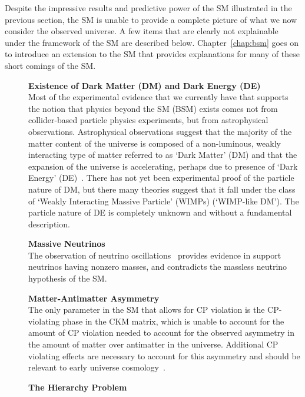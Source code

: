 Despite the impressive results and predictive power of the SM illustrated in the previous
section, the SM is unable to provide a complete picture of what we now consider the observed
universe.
A few items that are clearly not explainable under the framework of the SM are described below.
Chapter~\ref{chap:bsm} goes on to introduce an extension to the SM that provides explanations
for many of these short comings of the SM.

\begin{description}
    \item[] \textbf{Existence of Dark Matter (DM) and Dark Energy (DE)} \\
        Most of the experimental evidence that we currently have that supports the notion that
        physics beyond the SM (BSM) exists comes not from collider-based particle physics experiments,
        but from astrophysical observations.
        Astrophysical observations suggest that the majority of the matter content of the universe
        is composed of a non-luminous, weakly interacting type of matter referred to as `Dark Matter' (DM)
        and that the expansion of the universe is accelerating, perhaps due to presence of
        `Dark Energy' (DE)~\cite{Davis:2014csa,PlanckCollab}.
        There has not yet been experimental proof of the particle nature of DM, but there
        many theories suggest that it fall under the class of `Weakly Interacting Massive Particle' (WIMPs) (`WIMP-like DM').
        The particle nature of DE is completely unknown and without a fundamental description.
    \item[] \textbf{Massive Neutrinos} \\ The observation of neutrino oscillations~\cite{Fukuda:1998mi} provides evidence
        in support neutrinos having nonzero masses, and contradicts the massless neutrino hypothesis of the SM.
    \item[] \textbf{Matter-Antimatter Asymmetry} \\
        The only parameter in the SM that allows for CP violation is the CP-violating phase in the CKM matrix,
        which is unable to account for the amount of CP violation needed to account for the
        observed asymmetry in the amount of matter over antimatter in the universe.
        Additional CP violating effects are necessary to account for this asymmetry and should be relevant
        to early universe cosmology~\cite{Sakharov_1991}.
    \item[] \textbf{The Hierarchy Problem} \\

\end{description}
